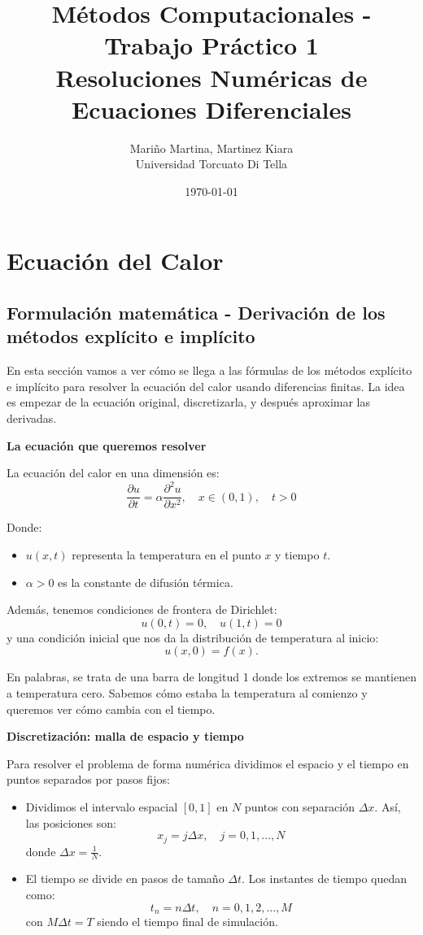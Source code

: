 \documentclass[12pt,a4paper]{article}
\title{\textbf{Métodos Computacionales - Trabajo Práctico 1}\\
Resoluciones Numéricas de Ecuaciones Diferenciales}
\author{
    Mariño Martina, Martinez Kiara\\ 
    Universidad Torcuato Di Tella
}
\date{\today}
\begin{document}
\maketitle
\thispagestyle{empty}
\newpage

\tableofcontents
\newpage


\section{Ecuación del Calor}
\subsection{Formulación matemática - Derivación de los métodos explícito e implícito}

En esta sección vamos a ver cómo se llega a las fórmulas de los métodos explícito e implícito para resolver la ecuación del calor usando diferencias finitas. La idea es empezar de la ecuación original, discretizarla, y después aproximar las derivadas.

\textbf{La ecuación que queremos resolver}

La ecuación del calor en una dimensión es:
\[
\frac{\partial u}{\partial t} = \alpha \frac{\partial^2 u}{\partial x^2},
\quad x \in (0,1), \quad t>0
\]

Donde:
\begin{itemize}
    \item $u(x,t)$ representa la temperatura en el punto $x$ y tiempo $t$.
    \item $\alpha > 0$ es la constante de difusión térmica.
\end{itemize}

Además, tenemos condiciones de frontera de Dirichlet:
\[
u(0,t) = 0, \quad u(1,t) = 0
\]
y una condición inicial que nos da la distribución de temperatura al inicio:
\[
u(x,0) = f(x).
\]

En palabras, se trata de una barra de longitud 1 donde los extremos se mantienen a temperatura cero. Sabemos cómo estaba la temperatura al comienzo y queremos ver cómo cambia con el tiempo.

\textbf{Discretización: malla de espacio y tiempo}

Para resolver el problema de forma numérica dividimos el espacio y el tiempo en puntos separados por pasos fijos:
\begin{itemize}
    \item Dividimos el intervalo espacial $[0,1]$ en $N$ puntos con separación $\Delta x$. Así, las posiciones son:
    \[
    x_j = j\Delta x, \quad j = 0,1,\dots,N
    \]
    donde $\Delta x = \frac{1}{N}$.
    \item El tiempo se divide en pasos de tamaño $\Delta t$. Los instantes de tiempo quedan como:
    \[
    t_n = n\Delta t, \quad n = 0,1,2,\dots,M
    \]
    con $M\Delta t = T$ siendo el tiempo final de simulación.
\end{itemize}
\end{document}
